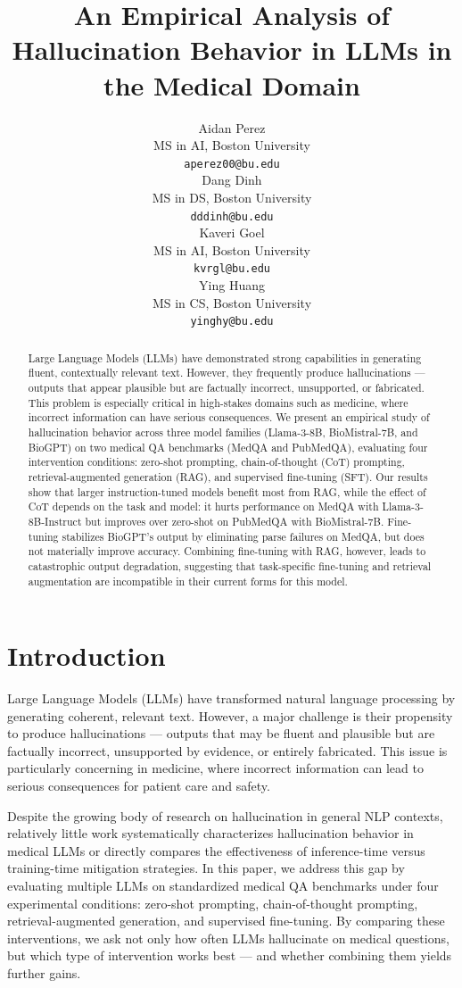 \documentclass[11pt]{article}
\title{An Empirical Analysis of Hallucination Behavior in LLMs in the Medical Domain}
\author{Aidan Perez \\
  MS in AI, Boston University\\
  \texttt{aperez00@bu.edu} \\\And
  Dang Dinh \\
  MS in DS, Boston University\\
  \texttt{dddinh@bu.edu} \\\AND
  Kaveri Goel \\
  MS in AI, Boston University\\
  \texttt{kvrgl@bu.edu} \\\And
  Ying Huang \\
  MS in CS, Boston University\\
  \texttt{yinghy@bu.edu} }
\begin{document}
\maketitle

\begin{abstract}
Large Language Models (LLMs) have demonstrated strong capabilities 
in generating fluent, contextually relevant text. However, they 
frequently produce hallucinations --- outputs that appear plausible but 
are factually incorrect, unsupported, or fabricated. This problem is 
especially critical in high-stakes domains such as medicine, where 
incorrect information can have serious consequences. We 
present an empirical study of hallucination behavior across 
three model families (Llama-3-8B, BioMistral-7B, and BioGPT) on two 
medical QA benchmarks (MedQA and PubMedQA), evaluating four 
intervention conditions: zero-shot prompting, chain-of-thought (CoT) 
prompting, retrieval-augmented generation (RAG), and supervised 
fine-tuning (SFT). Our results show that larger instruction-tuned 
models benefit most from RAG, while the effect of CoT depends on the 
task and model: it hurts performance on MedQA with Llama-3-8B-Instruct 
but improves over zero-shot on PubMedQA with BioMistral-7B. Fine-tuning stabilizes BioGPT's output by eliminating parse failures on MedQA, but does not materially improve accuracy. Combining fine-tuning 
with RAG, however, leads to catastrophic output degradation, suggesting 
that task-specific fine-tuning and retrieval augmentation are 
incompatible in their current forms for this model.
\end{abstract}

\section{Introduction}

Large Language Models (LLMs) have transformed natural language 
processing by generating coherent, relevant text. However, a major challenge 
is their propensity to produce hallucinations --- outputs that may be 
fluent and plausible but are factually incorrect, unsupported by 
evidence, or entirely fabricated. This issue is particularly concerning 
in medicine, where incorrect information can lead to serious consequences 
for patient care and safety.

Despite the growing body of research on hallucination in general NLP 
contexts, relatively little work systematically characterizes 
hallucination behavior in medical LLMs or directly compares the 
effectiveness of inference-time versus training-time mitigation 
strategies. In this paper, we address this gap by evaluating multiple 
LLMs on standardized medical QA benchmarks under four experimental 
conditions: zero-shot prompting, chain-of-thought prompting, 
retrieval-augmented generation, and supervised fine-tuning. By 
comparing these interventions, we ask not only 
how often LLMs hallucinate on medical questions, but which type of 
intervention works best --- and whether combining them yields further 
gains.
\end{document}
